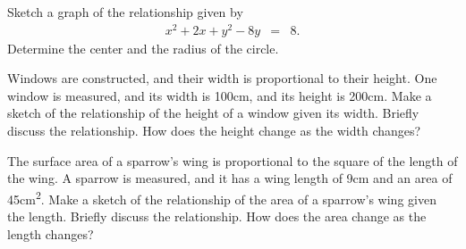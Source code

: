 \begin{problem}
\item Sketch a graph of the relationship given by
  \begin{eqnarray*}
    x^2 + 2x + y^2 - 8y & = & 8.
  \end{eqnarray*}
  Determine the center and the radius of the circle.
  \vfill

  \clearpage

\item Windows are constructed, and their width is proportional to
  their height. One window is measured, and its width is 100cm, and its
  height is 200cm. Make a sketch of the relationship of the height of
  a window given its width. Briefly discuss the relationship. How does
  the height change as the width changes?

  \vfill

\item The surface area of a sparrow's wing is proportional to the
  square of the length of the wing. A sparrow is measured, and it has
  a wing length of 9cm and an area of 45cm\textsuperscript{2}. Make a
  sketch of the relationship of the area of a sparrow's wing given the
  length. Briefly discuss the relationship. How does the area change
  as the length changes?

  \vfill


\end{problem}

\postClass

